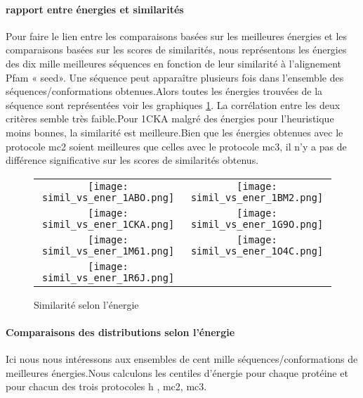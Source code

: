 \paragraph{rapport entre énergies et  similarités}
Pour faire le lien entre les comparaisons basées sur les meilleures énergies et les comparaisons basées sur les scores de similarités, nous représentons les énergies des dix mille meilleures séquences en fonction de leur similarité à l'alignement Pfam « seed». Une séquence peut apparaître plusieurs fois dans l'ensemble des séquences/conformations obtenues.Alors toutes les énergies trouvées de la séquence sont représentées voir les graphiques \ref{graph:simil_vs_ener}. La corrélation entre les deux critères semble très faible.Pour 1CKA malgré des énergies pour l'heuristique moins bonnes, la similarité est meilleure.Bien que les énergies obtenues avec le protocole mc2 soient meilleures que celles avec le protocole mc3, il n'y a pas de différence significative sur les scores de similarités obtenus.

   \begin{figure}[t]
     \centering
     \begin{tabular}{cc}
       \texttt{[image: simil\_vs\_ener\_1ABO.png]} &
       \texttt{[image: simil\_vs\_ener\_1BM2.png]} \\
       \texttt{[image: simil\_vs\_ener\_1CKA.png]} &
       \texttt{[image: simil\_vs\_ener\_1G9O.png]} \\
       \texttt{[image: simil\_vs\_ener\_1M61.png]} &
       \texttt{[image: simil\_vs\_ener\_1O4C.png]} \\
       \texttt{[image: simil\_vs\_ener\_1R6J.png]} \\
     \end{tabular}
     \caption{Similarité selon l'énergie}
\label{graph:simil_vs_ener}
   \end{figure}
 

\paragraph{Comparaisons des distributions selon l'énergie}

Ici nous nous intéressons aux ensembles de cent mille séquences/conformations de meilleures énergies.Nous calculons les centiles d'énergie pour chaque protéine et pour chacun des trois protocoles h , mc2, mc3.  

